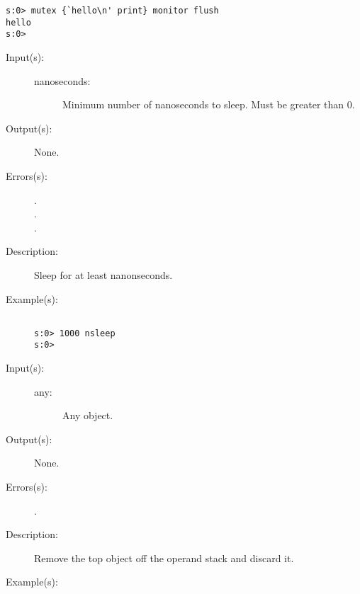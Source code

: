 \begin{description}
\begin{description}
\begin{verbatim}
s:0> mutex {`hello\n' print} monitor flush
hello
s:0>
		\end{verbatim}
	\end{description}
\label{systemdict:nsleep}
\item[{\stilop{nanoseconds}{nsleep}{--}}: ]
	\begin{description}\item[]
	\item[Input(s): ]
		\begin{description}\item[]
		\item[nanoseconds: ]
			Minimum number of nanoseconds to sleep.  Must be greater
			than 0.
		\end{description}
	\item[Output(s): ] None.
	\item[Errors(s): ]
		\begin{description}\item[]
		\item[.]
		\item[.]
		\item[.]
		\end{description}
	\item[Description: ]
		Sleep for at least  nanonseconds.
	\item[Example(s): ]\begin{verbatim}

s:0> 1000 nsleep
s:0>
		\end{verbatim}
	\end{description}
\label{systemdict:pop}
\item[{\stilop{any}{pop}{--}}: ]
	\begin{description}\item[]
	\item[Input(s): ]
		\begin{description}\item[]
		\item[any: ]
			Any object.
		\end{description}
	\item[Output(s): ] None.
	\item[Errors(s): ]
		\begin{description}\item[]
		\item[.]
		\end{description}
	\item[Description: ]
		Remove the top object off the operand stack and discard it.
	\item[Example(s): ]\begin{verbatim}


\end{verbatim}
\end{description}
\end{description}
